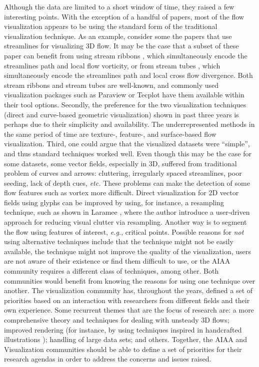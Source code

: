 Although the data are limited to a short window of time, they raised a few interesting points. 
%
With the exception of a handful of papers, most of the flow visualization appears to be using the standard form of the traditional visualization technique.
%
As an example, consider some the papers that use streamlines for visualizing 3D flow. 
%
It may be the case that a subset of these paper can benefit from using stream ribbons \cite{Ueng:1996:ESS:614262.614333}, which simultaneously encode the streamlines path and local flow vorticity,
%
or from stream tubes \cite{Ueng:1996:ESS:614262.614333}, which simultaneously encode the streamlines path and local cross flow divergence. 
%
Both stream ribbons and stream tubes are well-known, and commonly used visualization packages such as Paraview or Tecplot have them available within their tool options.
%
%
%
%
Secondly, the preference for the two visualization techniques (direct and curve-based geometric visualization) shown in past three years is perhaps due to their simplicity and availability. 
%
The underrepresented methods in the same period of time are texture-, feature-, and surface-based flow visualization.
%
%
%
%
%
Third, one could argue that the visualized datasets were ``simple'', and thus standard techniques worked well. 
%
Even though this may be the case for some datasets, some vector fields, especially in 3D, suffered from traditional problem of curves and arrows:
%
cluttering, irregularly spaced streamlines, poor seeding, lack of depth cues,  {\em etc.} 
%
These problems can make the detection of some flow features such as vortex more difficult. 
%
Direct visualization for 2D vector fields using glyphs can be improved by using, for instance, a resampling technique, such as shown in Laramee  \cite{Laramee2003905}, where the author introduce a user-driven approach for reducing visual clutter via resampling. 
%
Another way is to segment the flow using features of interest, \emph{e.g.}, critical points.
%
%
%
%
%
%
%
Possible reasons for \emph{not} using alternative techniques include that the technique might not be easily available, the technique might not improve the quality of the visualization, users are not aware of their existence or find them difficult to use, or the AIAA community 
requires a different class of techniques, among other.
%
%
Both communities would benefit from knowing the reasons for using one technique over another.  
%
The visualization community has, throughout the years, defined a set of priorities based on an interaction with researchers from different fields and their own experience.
%
Some recurrent themes that are the focus of research are: 
%
a more comprehensive theory and techniques for dealing with unsteady 3D flows; 
%
improved rendering (for instance, by using techniques inspired in handcrafted illustrations \cite{Brambilla12Illustrative});
%
handling of large data sets; and others.
%
Together, the AIAA and Visualization communities should be 
able to define a set of priorities for their research agendas 
in order to address the concerns and issues raised.



